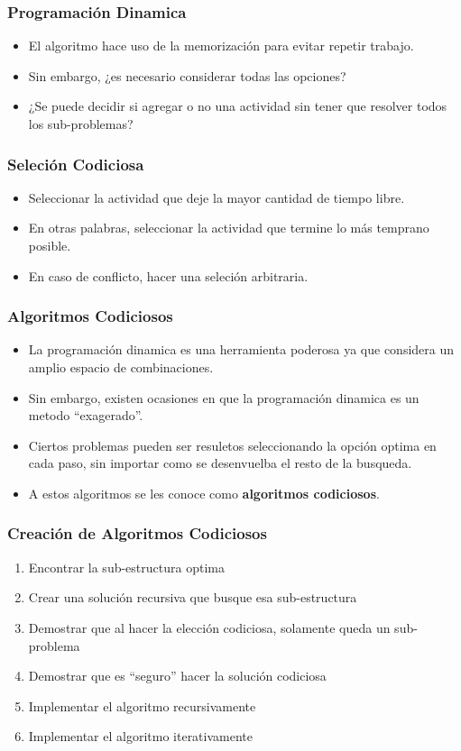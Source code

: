 \documentclass{beamer}
\begin{document}
\begin{frame}
\frametitle{Programaci\'on Dinamica}
\begin{itemize}
    \item{El algoritmo hace uso de la memorizaci\'on para
    evitar repetir trabajo.}
    \item{Sin embargo, ¿es necesario considerar todas las
    opciones?}
    \item{¿Se puede decidir si agregar o no una actividad
    sin tener que resolver todos los sub-problemas?}
\end{itemize}
\end{frame}

\begin{frame}
\frametitle{Seleci\'on Codiciosa}
\begin{itemize}
    \item{Seleccionar la actividad que deje la mayor
    cantidad de tiempo libre.}
    \item{En otras palabras, seleccionar la actividad
    que termine lo m\'as temprano posible.}
    \item{En caso de conflicto, hacer una seleci\'on
    arbitraria.}
\end{itemize}
\end{frame}

\begin{frame}
\frametitle{Algoritmos Codiciosos}
\begin{itemize}
    \item{La programaci\'on dinamica es una herramienta poderosa
    ya que considera un amplio espacio de combinaciones.}
    \item{Sin embargo, existen ocasiones en que la programaci\'on
    dinamica es un metodo ``exagerado''.}
    \item{Ciertos problemas pueden ser resuletos seleccionando
    la opci\'on optima en cada paso, sin importar como se
    desenvuelba el resto de la busqueda.}
    \item{A estos algoritmos se les conoce como {\bf algoritmos
    codiciosos}.}
\end{itemize}
\end{frame}

\begin{frame}
\frametitle{Creaci\'on de Algoritmos Codiciosos}
\begin{enumerate}
    \item{Encontrar la sub-estructura optima}
    \item{Crear una soluci\'on recursiva que busque esa sub-estructura}
    \item{Demostrar que al hacer la elecci\'on codiciosa,
    solamente queda un sub-problema}
    \item{Demostrar que es ``seguro'' hacer la soluci\'on codiciosa}
    \item{Implementar el algoritmo recursivamente}
    \item{Implementar el algoritmo iterativamente}
\end{enumerate}
\end{frame}
\end{document}
